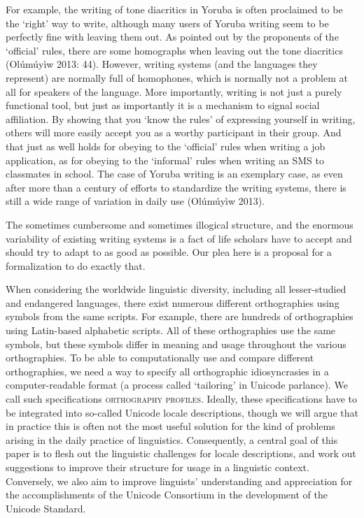 For example, the writing of tone diacritics in Yoruba is often proclaimed to be the `right' way to write, although many users of Yoruba writing seem to be perfectly fine with leaving them out. As pointed out by the proponents of the `official' rules, there are some homographs when leaving out the tone diacritics (Olúmúyìw 2013: 44). However, writing systems (and the languages they represent) are normally full of homophones, which is normally not a problem at all for speakers of the language. More importantly, writing is not just a purely functional tool, but just as importantly it is a mechanism to signal social affiliation. By showing that you `know the rules' of expressing yourself in writing, others will more easily accept you as a worthy participant in their group. And that just as well holds for obeying to the `official' rules when writing a job application, as for obeying to the `informal' rules when writing an SMS to classmates in school. The case of Yoruba writing is an exemplary case, as even after more than a century of efforts to standardize the writing systems, there is still a wide range of variation in daily use (Olúmúyìw 2013).

The sometimes cumbersome and sometimes illogical structure, and the enormous variability of existing writing systems is a fact of life scholars have to accept and should try to adapt to as good as possible. Our plea here is a proposal for a formalization to do exactly that.

When considering the worldwide linguistic diversity, including all lesser-studied and endangered languages, there exist numerous different orthographies using symbols from the same scripts. For example, there are hundreds of orthographies using Latin-based alphabetic scripts. All of these orthographies use the same symbols, but these symbols differ in meaning and usage throughout the various orthographies. To be able to computationally use and compare different orthographies, we need a way to specify all orthographic idiosyncrasies in a computer-readable format (a process called `tailoring' in Unicode parlance). We call such specifications \textsc{orthography profiles}. Ideally, these specifications have to be integrated into so-called Unicode locale descriptions, though we will argue that in practice this is often not the most useful solution for the kind of problems arising in the daily practice of linguistics. Consequently, a central goal of this paper is to flesh out the linguistic challenges for locale descriptions, and work out suggestions to improve their structure for usage in a linguistic context. Conversely, we also aim to improve linguists' understanding and appreciation for the accomplishments of the Unicode Consortium in the development of the Unicode Standard.

